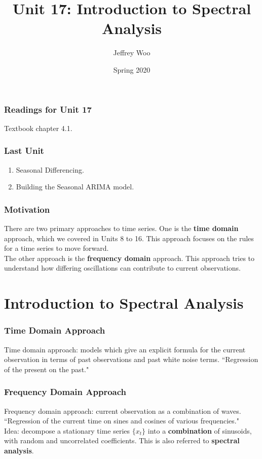 \documentclass[%
xcolor=pdftex]{beamer}
\title{Unit 17: Introduction to Spectral Analysis}
\author[STAT 5170: Applied Time Series, Unit 17]{Jeffrey Woo}
\institute{Department of Statistics, University of Virginia}
\date{Spring 2020}
\begin{document}
\frame{\titlepage}


\begin{frame}
\frametitle{Readings for Unit 17}

Textbook chapter 4.1.

\end{frame}



\begin{frame}
\frametitle{Last Unit}
\begin{enumerate}
\item Seasonal Differencing.
\item Building the Seasonal ARIMA model.
\end{enumerate}
\end{frame}

\begin{frame}
\frametitle{Motivation}

There are two primary approaches to time series.  One is the \textbf{time domain} approach, which we covered in Units 8 to 16.  This approach focuses on the rules for a time series to move forward.\\
\vspace{5mm}
The other approach is the \textbf{frequency domain} approach.  This approach tries to understand how differing oscillations can contribute to current observations.

\end{frame}

\section{Introduction to Spectral Analysis}
\frame{\tableofcontents[currentsection]}

\begin{frame}
\frametitle{Time Domain Approach}

Time domain approach: models which give an explicit formula for the current observation in terms of past observations and past white noise terms. ``Regression of the present on the past."

\end{frame}

\begin{frame}
\frametitle{Frequency Domain Approach}

Frequency domain approach: current observation as a combination of waves.  ``Regression of the current  time on sines and cosines of various frequencies."\\
\vspace{5mm}
Idea: decompose a stationary time series $\{x_t\}$ into a \textbf{combination} of sinusoids, with random and uncorrelated coefficients. This is also referred to \textbf{spectral analysis}.


\end{frame}
\end{document}
